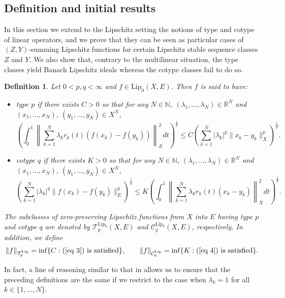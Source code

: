 \documentclass[12pt]{amsart}
\newtheorem{definition}[theorem]{Definition}
\def\C{\mathcal{C}}
\def\R{\mathbb{R}}
\def\T{\mathcal{T}}
\def\C{\mathcal{C}}
\def\N{\mathbb{N}}
\def\Lip{\mathrm{Lip}_0}
\def\Lipnorm{\mathrm{Lip}}
\begin{document}
\subsection{Definition and initial results}

In this section we extend to the Lipschitz setting the notions of type and cotype of linear operators, and we prove that they can be seen as particular cases of $(Z,Y)$-summing Lipschitz functions for certain Lipschitz stable sequence classes $Z$ and $Y$. We also show that, contrary to the multilinear situation, the type classes yield Banach Lipschitz ideals whereas the cotype classes fail to do so.

\begin{definition}\label{Def 2.1}
	Let $0<p,q<\infty$ and $f \in \Lip(X,E)$. Then $f$ is said to have:
	\begin{itemize}
		\item[$(i)$] type $p$ if there exists $C>0$ so that for any $N\in\N$, $(\lambda_1,\ldots, \lambda_N) \in \R^N$ and $(x_1,\ldots, x_N)$, $(y_1,\ldots, y_N) \in X^N$,
		\begin{equation}\label{eq 3}
		\left(\int_{0}^{1}\left\| \sum_{k=1}^{N} \lambda_k r_k(t)(f(x_k)-f(y_k)) \right\|_E^2 dt \right)^{\frac{1}{2}} \leq C \left(\sum_{k=1}^{N} |\lambda_k|^p \|x_k-y_k\|_X^p \right)^{\frac{1}{p}}.
		\end{equation}
		\item[$(ii)$] cotype $q$ if there exists $K>0$ so that for any $N\in\N$, $(\lambda_1,\ldots, \lambda_N) \in \R^N$ and $(x_1,\ldots, x_N)$, $(y_1,\ldots, y_N) \in X^N$,
		\begin{equation}\label{eq 4}
		\left(\sum_{k=1}^{N} |\lambda_k|^q\|f(x_k)-f(y_k)\|_E^q \right)^{\frac{1}{q}} \leq K \left(\int_{0}^{1}\left\| \sum_{k=1}^{N} \lambda_k r_k(t)(x_k-y_k) \right\|_X^2 dt \right)^{\frac{1}{2}}.
		\end{equation}
	\end{itemize}
	The subclasses of zero-preserving Lipschitz functions from $X$ into $E$ having type $p$ and cotype $q$ are denoted by $\T_p^{\Lip}(X,E)$ and $\C_q^{\Lip}(X,E)$, respectively. In addition, we define
		$$
		\|f\|_{\T_p^{\Lipnorm}} = \inf\{C: (\ref{eq 3}) \text{ is satisfied}\}, \qquad \|f\|_{\C_q^{\Lipnorm}} = \inf\{K: (\ref{eq 4}) \text{ is satisfied}\}.
		$$
\end{definition}

In fact, a line of reasoning similar to that in \cite[p. 2989]{FarJoh-09} allows us to ensure that the preceding definitions are the same if we restrict to the case when $\lambda_k=1$ for all $k\in\{1,\ldots, N\}$.
\end{document}
